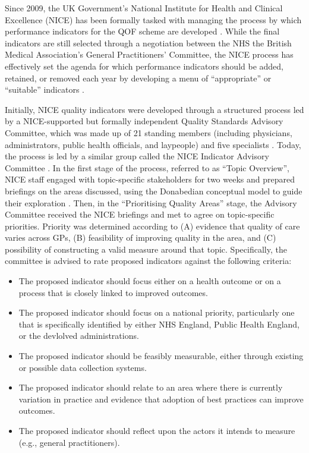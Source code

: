 \documentclass[12pt]{article}
\begin{document}
Since 2009, the UK Government's National Institute for Health and Clinical Excellence (NICE) has been formally tasked with managing the process by which performance indicators for the QOF scheme are developed \citep{sutcliffeNICEQualityOutcomes2012a}. While the final indicators are still selected through a negotiation between the NHS the British Medical Association's General Practitioners' Committee, the NICE process has effectively set the agenda for which performance indicators should be added, retained, or removed each year by developing a menu of ``appropriate'' or ``suitable'' indicators \citep{niceQualityOutcomesFramework}.

Initially, NICE quality indicators were developed through a structured process led by a NICE-supported but formally independent Quality Standards Advisory Committee, which was made up of 21 standing members (including physicians, administrators, public health officials, and laypeople) and five specialists \citep{bennettNICEProcessDeveloping2014}. Today, the process is led by a similar group called the NICE Indicator Advisory Committee \citep{nationalinstituteforhealthandcareexcellenceHealthSocialCare2017}. In the first stage of the process, referred to as ``Topic Overview'', NICE staff engaged with topic-specific stakeholders for two weeks and prepared briefings on the areas discussed, using the Donabedian conceptual model to guide their exploration \citep{donabedianExplorationsQualityAssessment1980}. Then, in the ``Prioritising Quality Areas'' stage, the Advisory Committee received the NICE briefings and met to agree on topic-specific priorities. Priority was determined according to (A) evidence that quality of care varies across GPs, (B) feasibility of improving quality in the area, and (C) possibility of constructing a valid measure around that topic. Specifically, the committee is advised to rate proposed indicators against the following criteria:

\begin{itemize}
  \item The proposed indicator should focus either on a health outcome or on a process that is closely linked to improved outcomes.
  \item The proposed indicator should focus on a national priority, particularly one that is specifically identified by either NHS England, Public Health England, or the devlolved administrations.
  \item The proposed indicator should be feasibly measurable, either through existing or possible data collection systems.
  \item The proposed indicator should relate to an area where there is currently variation in practice and evidence that adoption of best practices can improve outcomes.
  \item The proposed indicator should reflect upon the actors it intends to measure (e.g., general practitioners).
\end{itemize}
\end{document}
